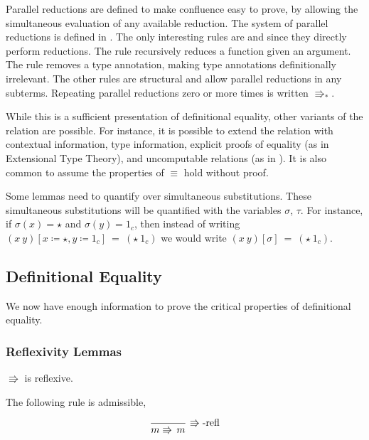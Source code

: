  Parallel reductions are defined to make confluence easy to prove, by allowing the simultaneous evaluation of any available reduction.
The system of parallel reductions is defined in .
The only interesting rules are  and  since they directly perform reductions.
The  rule recursively reduces a function given an argument.
The  rule removes a type annotation, making type annotations definitionally irrelevant.
The other rules are structural and allow parallel reductions in any subterms.
Repeating parallel reductions zero or more times is written $\Rrightarrow_{\ast}$.
 
While this is a sufficient presentation of definitional equality, other variants of the relation are possible.
For instance, it is possible to extend the relation with contextual information, type information, explicit proofs of equality (as in Extensional Type Theory), and uncomputable relations (as in \cite{jia2010dependent}).
It is also common to assume the properties of $\equiv$ hold without proof.
 
Some lemmas need to quantify over simultaneous substitutions.
These simultaneous substitutions will be quantified with the variables $\sigma$, $\tau$.
For instance, if $\sigma(x) = \star$ and $\sigma(y) = 1_c$, then instead of writing $(x\ y)[x \coloneqq \star,y \coloneqq 1_c]\ =\ (\star\ 1_c)$ we would write $(x\ y)[\sigma]\ =\ (\star\ 1_c)$.
 
 
\subsection{Definitional Equality}
 
We now have enough information to prove the critical properties of definitional equality.
 
\subsubsection{Reflexivity Lemmas}
\begin{lem}
$\Rrightarrow$ is reflexive.
 
The following rule is admissible,
 
\[
\frac{\,}{m\Rrightarrow\,m}\,\operatorname{\Rrightarrow-refl}
\]
\end{lem}
 

